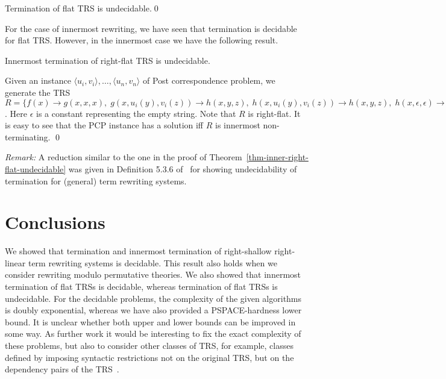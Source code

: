 \documentclass{LMCS}
\theoremstyle{plain}
\begin{document}
\begin{thm}\label{theorem-flat-undec}
Termination of flat TRS is undecidable.\qed
\end{thm}

For the case of innermost rewriting, we have
seen that termination is decidable for flat TRS.
However, in the innermost case we have the following result.

\begin{thm}\label{thm-inner-right-flat-undecidable}
Innermost termination
of right-flat TRS is undecidable.
\end{thm}
\proof
Given an instance 
$\langle u_i, v_i\rangle,\ldots,\langle u_n,v_n\rangle$
of Post correspondence problem,
we generate the TRS
$R = \{f(x) \rightarrow g(x,x,x),  \;
 g(x, u_i(y), v_i(z))\rightarrow h(x,y,z),  \;
 h(x, u_i(y), v_i(z))\rightarrow h(x,y,z),  \;
 h(x, \epsilon, \epsilon) \rightarrow f(x) \mid 1\leq i\leq n\}$.
Here $\epsilon$ is a constant representing the empty string.
Note that $R$ is right-flat.
It is easy to see that the PCP instance has a solution
iff $R$ is innermost non-terminating.
\qed


\noindent
{\em Remark:}
A reduction similar to the one in the proof of 
Theorem~\ref{thm-inner-right-flat-undecidable}
was given in Definition 5.3.6 of~\cite{TeReSe} for
showing undecidability of termination for 
(general) term rewriting systems.

\section{Conclusions}

\noindent We showed that termination and innermost termination 
of right-shallow right-linear term rewriting systems
is decidable.
This result also holds when we consider rewriting modulo permutative
theories.
We also showed that innermost termination of flat TRSs
is decidable, whereas termination of flat TRSs is undecidable.
For the decidable problems,
the complexity of the given algorithms
is doubly exponential, whereas we have also
provided a PSPACE-hardness lower bound.
It is unclear whether both upper and lower bounds can be improved
in some way. As further work it would be interesting
to fix the exact complexity of these problems, but also to
consider other classes of TRS,  for example, classes defined 
by imposing syntactic restrictions not on the original TRS,
but on the dependency pairs of the TRS~\cite{Sakai06,Sakai}.
\end{document}
